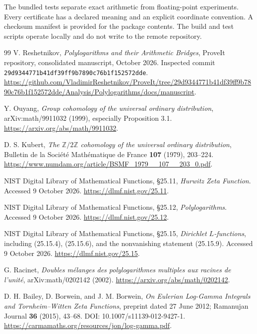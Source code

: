 \documentclass[11pt]{article}
\numberwithin{equation}{section}
\theoremstyle{definition}
\theoremstyle{remark}
\newcommand{\Z}{\mathbb Z}
\newcommand{\code}[1]{\texttt{\small #1}}
\begin{document}
The bundled tests separate exact arithmetic from floating-point
experiments. Every certificate has a declared meaning and an explicit
coordinate convention. A checksum manifest is provided for the package
contents. The build and test scripts operate locally and do not write
to the remote repository.

\clearpage
\begin{thebibliography}{99}
V. Reshetnikov, \emph{Polylogarithms and their Arithmetic Bridges},
ProveIt repository, consolidated manuscript, October 2026.
Inspected commit \code{29d9344771b41df39ff9b7890c76b1f152572dde}.
\url{https://github.com/VladimirReshetnikov/ProveIt/tree/29d9344771b41df39ff9b7890c76b1f152572dde/Analysis/Polylogarithms/docs/manuscript}.

Y. Ouyang, \emph{Group cohomology of the universal ordinary distribution},
arXiv:math/9911032 (1999), especially Proposition 3.1.
\url{https://arxiv.org/abs/math/9911032}.

D. S. Kubert, \emph{The $\Z/2\Z$ cohomology of the universal ordinary
distribution}, Bulletin de la Soci\'et\'e Math\'ematique de France
\textbf{107} (1979), 203--224.
\url{https://www.numdam.org/article/BSMF_1979__107__203_0.pdf}.

NIST Digital Library of Mathematical Functions, \S25.11,
\emph{Hurwitz Zeta Function}. Accessed 9 October 2026.
\url{https://dlmf.nist.gov/25.11}.

NIST Digital Library of Mathematical Functions, \S25.12,
\emph{Polylogarithms}. Accessed 9 October 2026.
\url{https://dlmf.nist.gov/25.12}.

NIST Digital Library of Mathematical Functions, \S25.15,
\emph{Dirichlet $L$-functions}, including (25.15.4), (25.15.6),
and the nonvanishing statement (25.15.9). Accessed 9 October 2026.
\url{https://dlmf.nist.gov/25.15}.

G. Racinet, \emph{Doubles m\'elanges des polylogarithmes multiples aux
racines de l'unit\'e}, arXiv:math/0202142 (2002).
\url{https://arxiv.org/abs/math/0202142}.

D. H. Bailey, D. Borwein, and J. M. Borwein,
\emph{On Eulerian Log-Gamma Integrals and Tornheim--Witten Zeta Functions},
preprint dated 27 June 2012; Ramanujan Journal \textbf{36} (2015), 43--68.
DOI: 10.1007/s11139-012-9427-1.
\url{https://carmamaths.org/resources/jon/log-gamma.pdf}.
\end{thebibliography}
\end{document}
